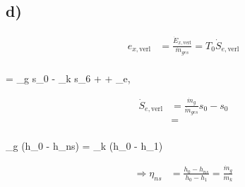 

\subsection*{d)}

\begin{align*}
e_{x,\text{verl}} &= \frac{\dot{E}_{x,\text{verl}}}{\dot{m}_{ges}} = T_0 \dot{S}_{e, \text{verl}} \\
\end{align*}

  = _g s_0 - _k s_6 +  + _{e, }

\begin{align*}
\dot{S}_{e, \text{verl}} &= \frac{\dot{m}_g}{\dot{m}_{ges}} s_0 - s_0 \\
&= \\
\end{align*}

 \quad {}_g (h_0 - h_{ns}) = _k (h_0 - h_1)

\begin{align*}
\Rightarrow \eta_{ns} &= \frac{h_0 - h_{ns}}{h_0 - h_1} = \frac{\dot{m}_g}{\dot{m}_k}
\end{align*}